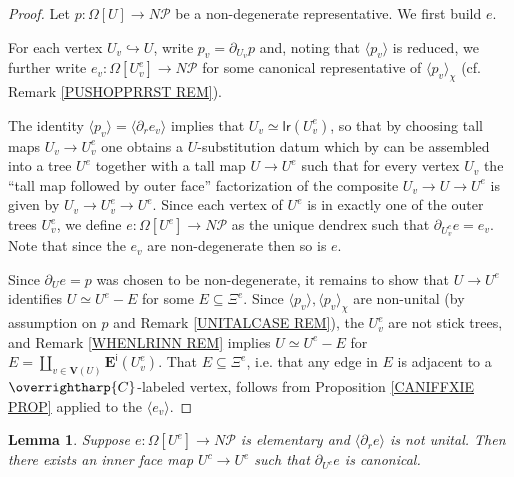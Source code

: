 \documentclass[a4paper,10pt
,draft
]{article}%
\numberwithin{equation}{section}
\numberwithin{figure}{section}
\newtheorem{lemma}[equation]{Lemma}%
\theoremstyle{definition} %
\newcommand{\vect}[1]{\text{\overrightharp{\ensuremath{#1}}}}
\newcommand{\1}{\ensuremath{\mathbbm 1}}%
\begin{document}
\begin{proof}
	Let $p\colon \Omega[U] \to N \mathcal{P}$
	be a non-degenerate representative. We first build $e$.
	
	For each vertex $U_v \hookrightarrow U$, write
	$p_v = \partial_{U_v} p$
	and,
	noting that $\langle p_v \rangle$ is reduced,
	we further write 
	$e_v \colon \Omega[U^e_v] \to N \mathcal{P}$
	for some canonical representative of 
	$\langle p_v \rangle_{\chi}$
	(cf. Remark \ref{PUSHOPPRRST REM}).
	
	
	The identity
	$\langle p_v \rangle = \langle \partial_r e_v \rangle$
	implies that
	$U_v \simeq \mathsf{lr}(U^e_v)$,
	so that by choosing tall maps $U_v \to U^e_v$ 
	one obtains a $U$-substitution datum
	\cite[Def. 3.43]{BP_geo}
	which by 
	\cite[Prop. 3.46]{BP_geo}
	can be assembled into a tree $U^e$
	together with a tall map
	$U \to U^e$ such that for every vertex $U_v$
	the ``tall map followed by outer face'' factorization of
	the composite
	$U_v \to U \to U^e$
	is given by
	$U_v \to U^e_v \to U^e$.
	Since each vertex of $U^e$ is in exactly one of the outer trees $U^e_v$,
	we define $e \colon \Omega[U^e] \to N \mathcal{P}$
	as the unique dendrex such that
	$\partial_{U^e_v} e = e_v$.
	Note that since the $e_v$ are non-degenerate 
	then so is $e$.
	
	
	Since $\partial_{U}e = p$ was chosen to be non-degenerate,
	it remains to show that
	$U \to U^e$ identifies $U \simeq U^e - E$
	for some $E \subseteq \Xi^{e}$.
	Since $\langle p_v \rangle, \langle p_v \rangle_{\chi}$ are non-unital
	(by assumption on $p$ and Remark \ref{UNITALCASE REM}),
	the $U^e_v$ are not stick trees,
	and Remark \ref{WHENLRINN REM} implies
	$U \simeq U^e-E$ for 
	$E = \amalg_{v \in \boldsymbol{V}(U)} \boldsymbol{E}^{\mathsf{i}}(U^e_v)$.
	That
	$E \subseteq \Xi^{e}$, i.e. that any edge in $E$ is adjacent to a $\vect{C}$-labeled vertex,
	follows from Proposition \ref{CANIFFXIE PROP}
	applied to the $\langle e_v \rangle$.
\end{proof}




\begin{lemma}\label{FORSAKEN LEM}
	Suppose $e \colon \Omega[U^e] \to N \mathcal{P}$ is elementary
	and $\langle \partial_r e\rangle$ is not unital.
	Then there exists an inner face map
	$U^c \to U^e$ such that $\partial_{U^c} e$ is canonical.
\end{lemma}
\end{document}
